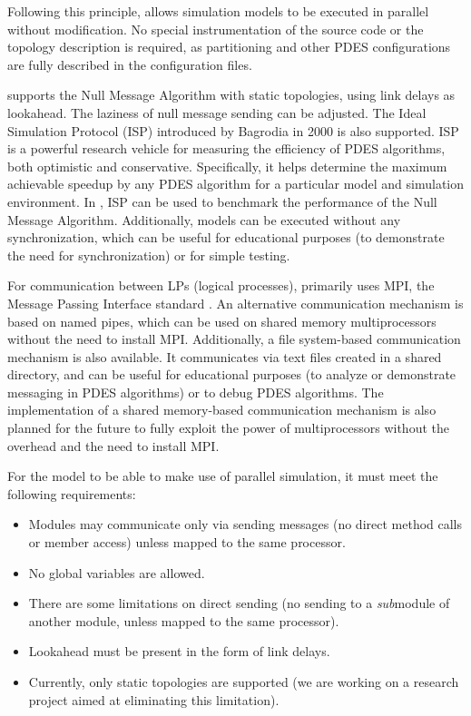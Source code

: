 Following this principle, {\opp} allows simulation models
to be executed in parallel without modification. No special instrumentation
of the source code or the topology description is required,
as partitioning and other PDES configurations are fully described
in the configuration files.

{\opp} supports the Null Message Algorithm with static
topologies, using link delays as lookahead. The laziness of null message
sending can be adjusted. The Ideal Simulation Protocol (ISP)
introduced by Bagrodia in 2000 \cite{bagrodia00} is also supported.
ISP is a powerful research vehicle for measuring the efficiency of
PDES algorithms, both optimistic and conservative.
Specifically, it helps determine the maximum achievable speedup
by any PDES algorithm for a particular model and simulation environment.
In {\opp}, ISP can be used to benchmark the performance of the
Null Message Algorithm.
Additionally, models can be executed without any synchronization, which
can be useful for educational purposes (to demonstrate the need for
synchronization) or for simple testing.

For communication between LPs (logical processes), {\opp}
primarily uses MPI, the Message Passing Interface standard
\cite{mpiforum94}. An alternative communication mechanism is based on
named pipes, which can be used on shared memory multiprocessors without the need
to install MPI. Additionally, a file system-based communication mechanism
is also available. It communicates via text files created in a shared
directory, and can be useful for educational purposes (to analyze or
demonstrate messaging in PDES algorithms) or to debug PDES algorithms.
The implementation of a shared memory-based communication mechanism is also planned
for the future to fully exploit the power of multiprocessors without
the overhead and the need to install MPI.

For the model to be able to make use of parallel simulation, it must meet the following requirements:

\begin{itemize}
  \item{Modules may communicate only via sending messages (no direct method calls
        or member access) unless mapped to the same processor.}
  \item No global variables are allowed.
  \item{There are some limitations on direct sending (no sending to a \textit{sub}module
        of another module, unless mapped to the same processor).}
  \item Lookahead must be present in the form of link delays.
  \item{Currently, only static topologies are supported (we are working on a
      research project aimed at eliminating this limitation).}
\end{itemize}

